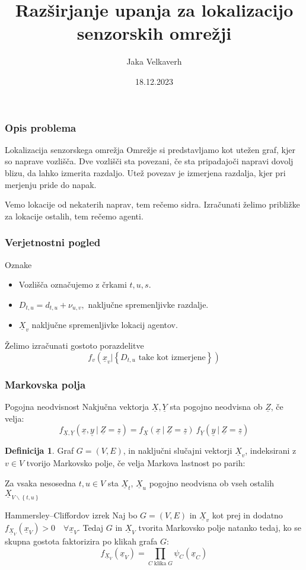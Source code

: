 \documentclass{beamer}
\title[Razširjanje upanja]{Razširjanje upanja za lokalizacijo senzorskih omrežji}
\author{Jaka Velkaverh}
\institute{UL FMF}
\date{18.12.2023}
\theoremstyle{definition}
\newtheorem{definicija}{Definicija}
\begin{document}
	\frame{\titlepage}

	\begin{frame}
		\frametitle{Opis problema}
		\begin{block}{Lokalizacija senzorskega omrežja}
			Omrežje si predstavljamo kot utežen graf, kjer so naprave vozlišča.
			Dve vozlišči sta povezani, če sta pripadajoči napravi dovolj blizu,
			da lahko izmerita razdaljo. Utež povezav je izmerjena razdalja,
			kjer pri merjenju pride do napak.

			Vemo lokacije od nekaterih naprav, tem rečemo sidra. Izračunati
			želimo približke za lokacije ostalih, tem rečemo agenti.
		\end{block}
	\end{frame}
	\begin{frame}
		\frametitle{Verjetnostni pogled}
		Oznake
		\begin{itemize}
			\item Vozlišča označujemo z črkami $t, u, s$.
			\item $D_{t,u} = d_{t,u} + \nu_{u, v},$ naključne spremenljivke razdalje.
			\item $\underline{X}_v$ naključne spremenljivke lokacij agentov.
		\end{itemize}

		Želimo izračunati gostoto porazdelitve
		$$f_v\left(\underline{x}_v | \left\{D_{t,u} \text{ take kot izmerjene}\right\}\right)$$
	\end{frame}

	\begin{frame}
		\frametitle{Markovska polja}
		\begin{block}{Pogojna neodvisnost}
			Nakjučna vektorja $\underline{X}, \underline{Y}$ sta pogojno
			neodvisna ob $\underline{Z}$, če velja:
			$$f_{\underline{X}, \underline{Y}}\left(\underline{x}, \underline{y}\ |\ \underline{Z} = \underline{z}\right) =
			  f_{\underline{X}}\left(\underline{x}\ |\ \underline{Z} = \underline{z}\right) \
			  f_{\underline{Y}}\left(\underline{y}\ |\ \underline{Z} = \underline{z}\right)
			$$
		\end{block}
		\begin{definicija}
			Graf $G = \left(V, E\right)$, in naključni slučajni vektorji
			$\underline{X}_v$, indeksirani z $v \in V$ tvorijo Markovsko polje,
			če velja Markova lastnost po parih:

			Za vsaka nesosedna $t, u \in V$ sta $\underline{X}_t$, $\underline{X}_u$
			pogojno neodvisna ob vseh ostalih
			$\underline{X}_{V\backslash\left\{t, u\right\}}$
		\end{definicija}
	\end{frame}

	\begin{block}{Hammersley–Cliffordov izrek}
		Naj bo $G = \left(V, E\right)$ in $\underline{X}_v$ kot prej in dodatno
		$f_{\underline{X}_V}\left(\underline{x}_V\right) > 0\quad \forall \underline{x}_V$.
		Tedaj $G$ in $\underline{X}_V$ tvorita Markovsko polje natanko tedaj,
		ko se skupna gostota faktorizira po klikah grafa $G$:
		$$f_{\underline{X}_V}\left(\underline{x}_V\right) =
			\prod_{C\;\text{klika}\;G}\psi_C\left(\underline{x}_C\right)$$
	\end{block}
\end{document}
